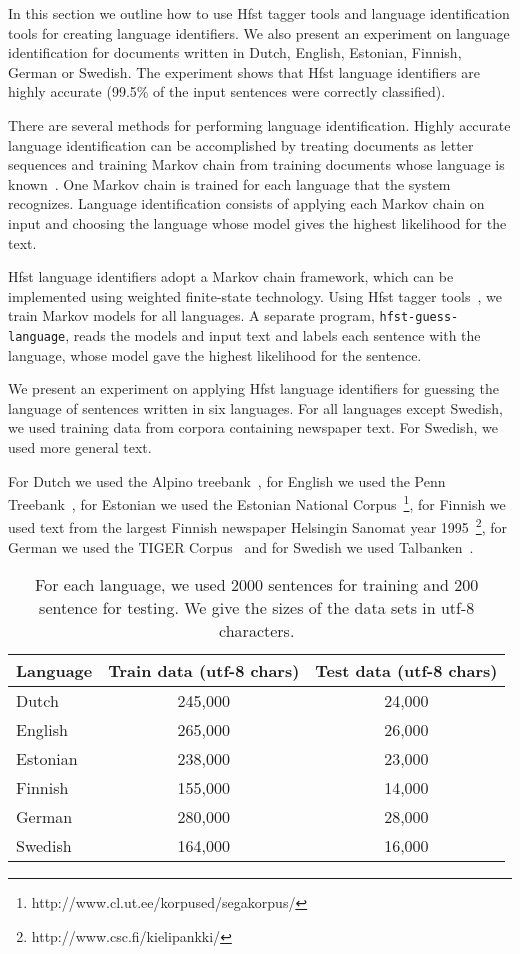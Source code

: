 \documentclass{llncs}
\begin{document}
In this section we outline how to use Hfst tagger tools and language
identification tools for creating language identifiers. We also
present an experiment on language identification for documents written
in Dutch, English, Estonian, Finnish, German or Swedish. The
experiment shows that Hfst language identifiers are highly accurate
(99.5\% of the input sentences were correctly classified).

There are several methods for performing language
identification. Highly accurate language identification can be
accomplished by treating documents as letter sequences and training
Markov chain from training documents whose language is
known~\cite{cavnar/1994}. One Markov chain is trained for each
language that the system recognizes. Language identification consists
of applying each Markov chain on input and choosing the language whose
model gives the highest likelihood for the text. 

Hfst language identifiers adopt a Markov chain framework, which can be
implemented using weighted finite-state technology. Using Hfst tagger
tools~\cite{silfverberg/2011}, we train Markov models for all
languages. A separate program, {\tt hfst-guess-language}, reads the
models and input text and labels each sentence with the language,
whose model gave the highest likelihood for the sentence.

We present an experiment on applying Hfst language identifiers for
guessing the language of sentences written in six languages. For all
languages except Swedish, we used training data from corpora
containing newspaper text. For Swedish, we used more general text.

For Dutch we used the Alpino treebank~\cite{bouma/2000}, for English
we used the Penn Treebank~\cite{marcus/1993}, for Estonian we used the
Estonian National
Corpus~\footnote{http://www.cl.ut.ee/korpused/segakorpus/}, for
Finnish we used text from the largest Finnish newspaper Helsingin
Sanomat year 1995~\footnote{http://www.csc.fi/kielipankki/}, for
German we used the TIGER Corpus~\cite{brants/2002} and for Swedish we
used Talbanken~\cite{einarsson/1976}.

\begin{table}
\begin{center}
\begin{tabular}{l|cc}
Language & Train data (utf-8 chars) & Test data (utf-8 chars)\\
\hline
Dutch    & 245,000  & 24,000\\
English  & 265,000  & 26,000\\
Estonian & 238,000  & 23,000\\
Finnish  & 155,000  & 14,000\\
German   & 280,000  & 28,000\\
Swedish  & 164,000  & 16,000\\
\end{tabular}
\caption{For each language, we used 2000 sentences for training and
  200 sentence for testing. We give the sizes of the data sets in
  utf-8 characters.}\label{tab:lang-id-data}
\end{center}
\end{table}
\end{document}
